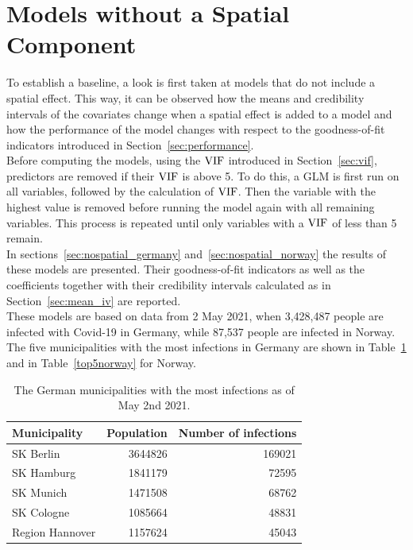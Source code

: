 \section{Models without a Spatial Component}\label{sec:nospatial}
To establish a baseline, a look is first taken at models that do not include a spatial effect. This way, it can be observed how the means and credibility intervals of the covariates change when a spatial effect is added to a model and how the performance of the model changes with respect to the goodness-of-fit indicators introduced in Section~\ref{sec:performance}. \\
Before computing the models, using the $\hbox{VIF}$ introduced in Section~\ref{sec:vif}, predictors are removed if their $\hbox{VIF}$ is above 5. To do this, a GLM is first run on all variables, followed by the calculation of $\hbox{VIF}$. Then the variable with the highest value is removed before running the model again with all remaining variables. This process is repeated until only variables with a $\hbox{VIF}$ of less than 5 remain. \\
In sections~\ref{sec:nospatial_germany} and~\ref{sec:nospatial_norway} the results of these models are presented. Their goodness-of-fit indicators as well as the coefficients together with their credibility intervals calculated as in Section~\ref{sec:mean_iv} are reported. \\
These models are based on data from 2 May 2021, when 3,428,487 people are infected with Covid-19 in Germany, while 87,537 people are infected in Norway. The five municipalities with the most infections in Germany are shown in Table~\ref{top5germany} and in Table~\ref{top5norway} for Norway.
\begin{table}[H] 
\caption{The German municipalities with the most infections as of May 2nd 2021. \label{top5germany}}
\begin{tabular}{l r r}
\toprule
\textbf{Municipality}	& \textbf{Population}	& \textbf{Number of infections} \\
\midrule
SK Berlin & 3644826 & 169021  \\   
SK Hamburg & 1841179 & 72595  \\
SK Munich & 1471508 & 68762  \\
SK Cologne & 1085664 & 48831  \\
Region Hannover & 1157624 & 45043  \\
\bottomrule
\end{tabular}
\end{table}
